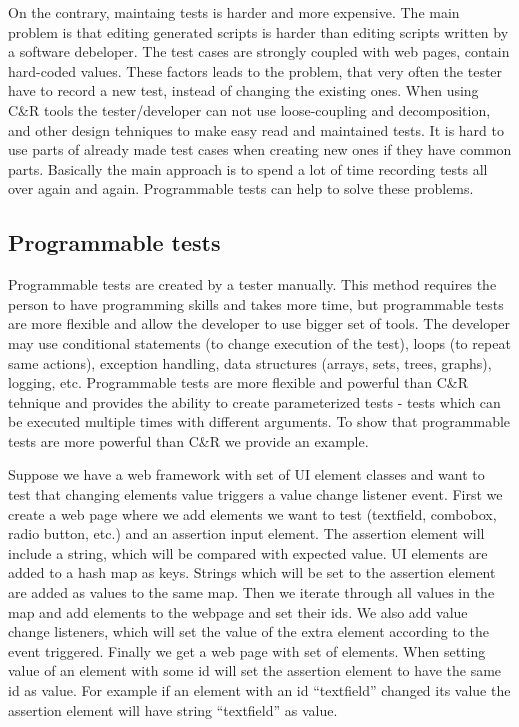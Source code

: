 \documentclass{article}
\begin{document}
			On the contrary, maintaing tests is harder and more expensive.
			The main problem is that editing generated scripts is harder than editing
			scripts written by a software debeloper. The test cases are strongly coupled
			with web pages, contain hard-coded values. These factors leads to the
			problem, that very often the tester have to record a new test, instead of
			changing the existing ones. When using C\&R tools the tester/developer can
			not use loose-coupling and decomposition, and other design tehniques to make
			easy read and maintained tests. It is hard to use parts of already made test
			cases when creating new ones if they have common parts. Basically the main
			approach is to spend a lot of time recording tests all over again and again.
			Programmable tests can help to solve these problems.
			
		\subsection{Programmable tests} 
			Programmable tests are created by a tester manually. This method requires the
			person to have programming skills and takes more time, but programmable tests
			are more flexible and allow the developer to use bigger set of tools. The
			developer may use conditional statements (to change execution of the test),
			loops (to repeat same actions), exception handling, data structures (arrays,
			sets, trees, graphs), logging, etc. Programmable tests are more flexible and
			powerful than C\&R tehnique and provides the ability to create parameterized
			tests - tests which can be executed multiple times with different arguments.
			To show that programmable tests are more powerful than C\&R we provide an
			example.
			
			Suppose we have a web framework with set of UI element classes and want to
			test that changing elements value triggers a value change listener event.
			First we create a web page where we add elements we
			want to test (textfield, combobox, radio button, etc.) and an assertion input
			element. The assertion element will include a string, which will be
			compared with expected value.
			UI elements are added to a hash map as keys.
			Strings which will be set to the assertion element are added as values to the same map. Then we
			iterate through all values in the map and add elements to the webpage and set
			their ids. We also add value change listeners, which will set
			the value of the extra element according to the event triggered. Finally we
			get a web page with set of elements. When setting value of an element with
			some id will set the assertion element to have the same id as value. For
			example if an element with an id ``textfield'' changed its value the
			assertion element will have string ``textfield'' as value.
					
\end{document}
